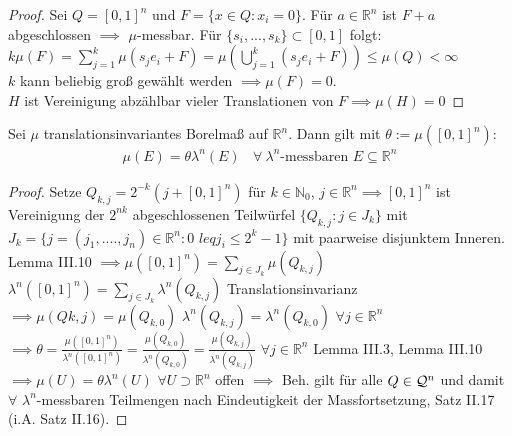     \begin{proof}
        Sei $Q = [0,1]^n$ und $F = \{x\in Q: x_i = 0\}$. Für $a\in\mathbb{R}^n$ ist $F+a$ abgeschlossen $\implies$ $\mu$-messbar. Für $\{s_i, ..., s_k\} \subset [0,1]$ folgt: \\ 
        $k\mu(F) = \sum\limits_{j=1}^{k}\mu(s_j e_i + F) = \mu(\bigcup\limits_{j=1}^{k}(s_j e_i + F)) \leq \mu(Q) < \infty$  \\
        $k$ kann beliebig groß gewählt werden $\implies \mu(F) = 0$. \\
        $H$ ist Vereinigung abzählbar vieler Translationen von $F \implies \mu(H) = 0$
    \end{proof}

    \begin{theorem}
      Sei $\mu$ translationsinvariantes Borelmaß auf $\mathbb{R}^n$. Dann gilt mit $\theta := \mu([0,1]^n)$:
      \begin{align*}
        \mu(E) = \theta \lambda^n(E) \ \ \ \ \forall \ \lambda^n \text{-messbaren } E \subseteq \mathbb{R}^n
      \end{align*}
    \end{theorem}

      \begin{proof}
    Setze $Q_{k,j} = 2^{-k}(j+[0,1]^n)$ für $k\in\mathbb{N}_0$, $j\in\mathbb{R}^n \implies [0,1]^n$ ist Vereinigung der $2^{nk}$ abgeschlossenen Teilwürfel $\{Q_{k,j}: j\in J_k\}$ mit $J_k = \{j = (j_1, ...., j_n) \in \mathbb{R}^n: 0$ $leq j_i \leq 2^k-1\}$ mit paarweise disjunktem Inneren. Lemma III.10 \newline  $\implies \mu([0,1]^n) = \sum\limits_{j\in J_k} \mu(Q_{k,j})$ \newline
    $\lambda^n([0,1]^n) = \sum\limits_{j\in J_k} \lambda^n(Q_{k,j})$ \newline
    Translationsinvarianz $\implies \mu(Q{k,j}) = \mu(Q_{k,0})$ \newline
    $\lambda^n(Q_{k,j}) = \lambda^n(Q_{k,0})$ $\forall  j\in \mathbb{R}^n$ \newline
    $\implies \theta = \frac{\mu([0,1]^n)}{\lambda^n([0,1]^n)} = \frac{\mu(Q_{k,0})}{\lambda^n(Q_{k,0})} = \frac{\mu(Q_{k,j})}{\lambda^n(Q_{k,j})}$ $\forall j\in \mathbb{R}^n$ \newline
    Lemma III.3, Lemma III.10 $\implies \mu(U) = \theta \lambda^n(U)$ $\forall U\supset \mathbb{R}^n$ offen \newline
    $\implies$ Beh. gilt für alle $Q \in \mathcal{Q}^n$ und damit $\forall$ $\lambda^n$-messbaren Teilmengen nach Eindeutigkeit der Massfortsetzung, Satz II.17 (i.A. Satz II.16). 
  \end{proof}

